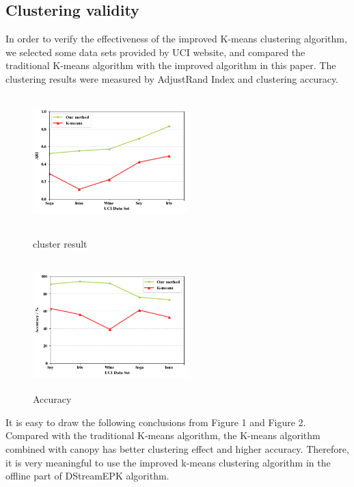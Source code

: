 \documentclass[runningheads]{llncs}
\begin{document}
\subsection{Clustering validity}
In order to verify the effectiveness of the improved K-means clustering algorithm, we selected some data sets provided by UCI website, and compared the traditional K-means algorithm with the improved algorithm in this paper. The clustering results were measured by AdjustRand Index and clustering accuracy. 
\begin{figure}
	\begin{minipage}[t]{0.5\linewidth}
		\includegraphics[height=5cm,width=6cm]{k_meansResult.png}
		\caption{cluster result} \label{k_meansResult}
	\end{minipage}%
	\begin{minipage}[t]{0.5\linewidth}
		\includegraphics[height=5cm,width=6cm]{accuracy.png}
		\caption{Accuracy} \label{accuracy}
	\end{minipage}
\end{figure}
It is easy to draw the following conclusions from Figure 1 and Figure 2. Compared with the traditional K-means algorithm, the K-means algorithm combined with canopy has better clustering effect and higher accuracy. Therefore, it is very meaningful to use the improved k-means clustering algorithm in the offline part of DStreamEPK algorithm. 
\end{document}
